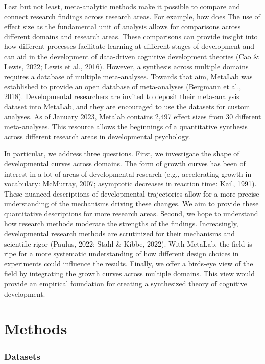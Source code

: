 \documentclass[10pt, letterpaper]{article}
\begin{document}
Last but not least, meta-analytic methods make it possible to compare
and connect research findings across research areas. For example, how
does The use of effect size as the fundamental unit of analysis allows
for comparisons across different domains and research areas. These
comparisons can provide insight into how different processes facilitate
learning at different stages of development and can aid in the
development of data-driven cognitive development theories (Cao \& Lewis,
2022; Lewis et al., 2016). However, a synthesis across multiple domains
requires a database of multiple meta-analyses. Towards that aim, MetaLab
was established to provide an open database of meta-analyses (Bergmann
et al., 2018). Developmental researchers are invited to deposit their
meta-analysis dataset into MetaLab, and they are encouraged to use the
datasets for custom analyses. As of January 2023, Metalab contains 2,497
effect sizes from 30 different meta-analyses. This resource allows the
beginnings of a quantitative synthesis across different research areas
in developmental psychology.

In particular, we address three questions. First, we investigate the
shape of developmental curves across domains. The form of growth curves
has been of interest in a lot of areas of developmental research (e.g.,
accelerating growth in vocabulary: McMurray, 2007; asymptotic decreases
in reaction time: Kail, 1991). These nuanced descriptions of
developmental trajectories allow for a more precise understanding of the
mechanisms driving these changes. We aim to provide these quantitative
descriptions for more research areas. Second, we hope to understand how
research methods moderate the strengths of the findings. Increasingly,
developmental research methods are scrutinized for their mechanisms and
scientific rigor (Paulus, 2022; Stahl \& Kibbe, 2022). With MetaLab, the
field is ripe for a more systematic understanding of how different
design choices in experiments could influence the results. Finally, we
offer a birds-eye view of the field by integrating the growth curves
across multiple domains. This view would provide an empirical foundation
for creating a synthesized theory of cognitive development.

\hypertarget{methods}{%
\section{Methods}\label{methods}}

\hypertarget{datasets}{%
\subsubsection{Datasets}\label{datasets}}
\end{document}
